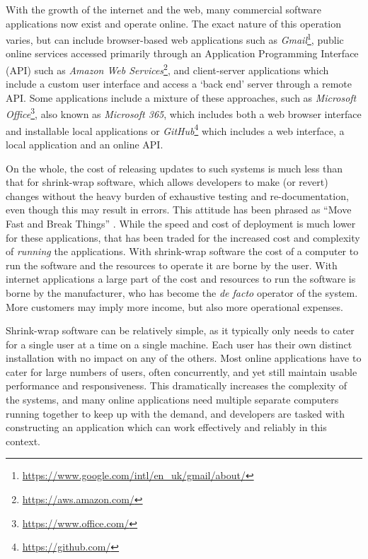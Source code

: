 With the growth of the internet and the web, many commercial software applications now exist and operate online. The exact nature of this operation varies, but can include browser-based web applications such as \emph{Gmail}\footnote{\url{https://www.google.com/intl/en_uk/gmail/about/}}, public online services accessed primarily through an Application Programming Interface (API) such as \emph{Amazon Web Services}\footnote{\url{https://aws.amazon.com/}}, and client-server applications which include a custom user interface and access a `back end' server through a remote API. Some applications include a mixture of these approaches, such as \emph{Microsoft Office}\footnote{\url{https://www.office.com/}}, also known as \emph{Microsoft 365}, which includes both a web browser interface and installable local applications or \emph{GitHub}\footnote{\url{https://github.com/}} which includes a web interface, a local application and an online API.

On the whole, the cost of releasing updates to such systems is much less than that for shrink-wrap software, which allows developers to make (or revert) changes without the heavy burden of exhaustive testing and re-documentation, even though this may result in errors. This attitude has been phrased as \enquote{Move Fast and Break Things} \citep{Taplin2018}. While the speed and cost of deployment is much lower for these applications, that has been traded for the increased cost and complexity of \emph{running} the applications. With shrink-wrap software the cost of a computer to run the software and the resources to operate it are borne by the user. With internet applications a large part of the cost and resources to run the software is borne by the manufacturer, who has become the \emph{de facto} operator of the system. More customers may imply more income, but also more operational expenses. 

Shrink-wrap software can be relatively simple, as it typically only needs to cater for a single user at a time on a single machine. Each user has their own distinct installation with no impact on any of the others. Most online applications have to cater for large numbers of users, often concurrently, and yet still maintain usable performance and responsiveness. This dramatically increases the complexity of the systems, and many online applications need multiple separate computers running together to keep up with the demand, and developers are tasked with constructing an application which can work effectively and reliably in this context.

